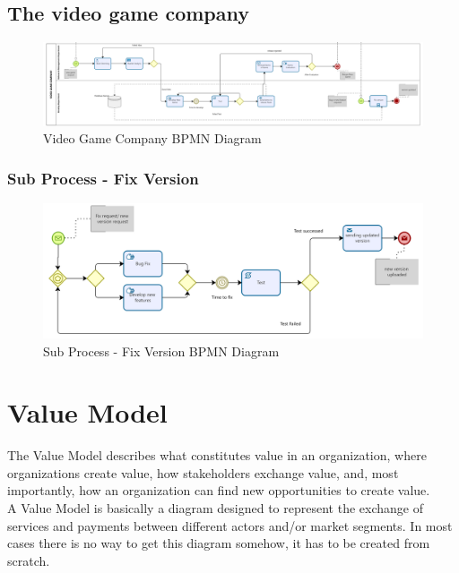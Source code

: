 \documentclass[a4paper,12pt]{report}
\begin{document}
\section{The video game company  }
\begin{figure}[H]
 \centering
\includegraphics[scale=0.15]{videogame_BPMN}
\caption{Video Game Company BPMN Diagram}
\label{VideoGame BPMN}
\end{figure} 

\subsection{Sub Process - Fix Version }
\begin{figure}[H]
 \centering
\includegraphics[scale=0.35]{developer_BPMN}
\caption{Sub Process - Fix Version BPMN Diagram}
\label{Fix Version BPMN}

\end{figure} 

\chapter{Value Model}
The Value Model describes what constitutes value in an organization, where organizations create value, how stakeholders exchange value, and, most importantly, how an organization can find new opportunities to create value.\\
A Value Model is basically a diagram designed to represent the exchange of services and payments
between different actors and/or market segments. In most cases there is no way to get
this diagram somehow, it has to be created from scratch.
\end{document}

